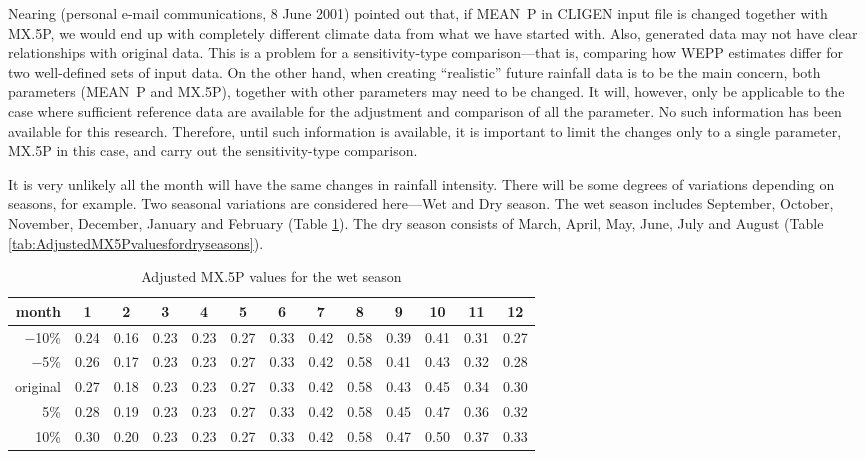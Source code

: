 Nearing (personal e-mail communications, 8 June 2001) pointed out that, if
MEAN~P in CLIGEN input file is changed together with {MX.5P}, we would end up
with completely different climate data from what we have started with. Also,
generated data may not have clear relationships with original data. This is a
problem for a sensitivity-type comparison---that is, comparing how WEPP
estimates differ for two well-defined sets of input data. On the other hand,
when creating ``realistic'' future rainfall data is to be the main concern, both
parameters (MEAN~P and {MX.5P}), together with other parameters may need to be
changed. It will, however, only be applicable to the case where sufficient
reference data are available for the adjustment and comparison of all the
parameter. No such information has been available for this research. Therefore,
until such information is available, it is important to limit the changes only
to a single parameter, {MX.5P} in this case, and carry out the sensitivity-type
comparison.

It is very unlikely all the month will have the same changes in rainfall
intensity. There will be some degrees of variations depending on seasons, for
example. Two seasonal variations are considered here---Wet and Dry season. The
wet season includes September, October, November, December, January and February
(Table \ref{tab:AdjustedMX5Pvaluesforwetseasons}). The dry season consists of
March, April, May, June, July and August (Table
\ref{tab:AdjustedMX5Pvaluesfordryseasons}).

\begin{table}[htbp]
  \centering
  \footnotesize
  \caption{Adjusted {MX.5P} values for the wet season}
  \label{tab:AdjustedMX5Pvaluesforwetseasons}
    \begin{tabular}{r|cc|cccccc|cccc}
      \toprule
      month & \textbf{1} & \textbf{2} & 3 & 4 &5& 6& 7& 8& \textbf{9}
&\textbf{10}& \textbf{11}& \textbf{12}\\
      \midrule
      $-$10\% & 0.24 & 0.16 & 0.23 & 0.23&  0.27 & 0.33 & 0.42 & 0.58 & 0.39 &
0.41 & 0.31 & 0.27\\
      $-$5\%  &0.26 & 0.17 & 0.23 & 0.23 & 0.27 & 0.33 & 0.42 & 0.58 & 0.41 &
0.43 & 0.32 & 0.28\\
      original & 0.27 & 0.18 & 0.23  &0.23 & 0.27 & 0.33 &0.42 & 0.58 & 0.43 &
0.45 & 0.34 & 0.30\\
      5\% & 0.28 & 0.19 & 0.23 & 0.23 & 0.27 & 0.33 & 0.42& 0.58 & 0.45 & 0.47 &
0.36 & 0.32\\
      10\% & 0.30 & 0.20 & 0.23 & 0.23 & 0.27 & 0.33 & 0.42 & 0.58 & 0.47& 0.50
& 0.37 & 0.33\\
      \bottomrule
    \end{tabular}
\end{table}

